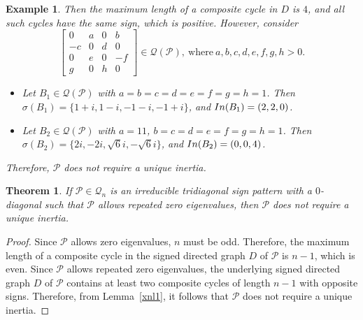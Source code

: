\documentclass[10pt,a4paper]{amsart}
\newtheorem{theorem}{Theorem}[section]
\newtheorem{eg}{Example}[section]
\numberwithin{equation}{section}
\def\In{{\rm In}}
\begin{document}
\begin{eg}
		Then the maximum length of a composite cycle in $D$ is $4$, and all such cycles have the same sign, which is positive. However, consider	$$\begin{bmatrix}
			0&a&0&b\\ -c&0&d&0\\ 0&e&0&-f\\ g&0&h&0
		\end{bmatrix}\in \mathcal{Q}(\mathcal{P}), ~\text{where}~ a,b,c,d,e,f,g,h>0.$$ \begin{itemize}
			\item[i.] Let $B_1 \in \mathcal{Q}(\mathcal{P})$ with $a = b = c = d = e = f = g = h = 1$. Then $\sigma(B_1) = \{1+i, 1-i,-1-i,-1+i\}$, and $\In(B_1) = (2, 2, 0)$.
			\item[ii.] Let $B_2 \in \mathcal{Q}(\mathcal{P})$ with $a = 11$, $ b = c = d = e = f = g = h = 1$. Then $\sigma(B_2) = \{2i,-2i,\sqrt{6}i,-\sqrt{6}i\}$, and $\In(B_2) = (0, 0, 4)$.
		\end{itemize}
		Therefore, $\mathcal{P}$ does not require a unique inertia.
	\end{eg}
	
	\begin{theorem} \label{l3.1n}
		If $\mathcal{P}\in \mathcal{Q}_n$ is an irreducible tridiagonal sign pattern with a $0$-diagonal such that $\mathcal{P}$ allows repeated zero eigenvalues, then $\mathcal{P}$ does not require a unique inertia.
	\end{theorem}
	\begin{proof} Since $\mathcal{P}$ allows zero eigenvalues, $n$ must be odd. Therefore, the maximum length of a composite cycle in the signed directed graph $D$ of $\mathcal{P}$ is $n-1$, which is even. Since $\mathcal{P}$ allows repeated zero eigenvalues, the underlying signed directed graph $D$ of $\mathcal{P}$ contains at least two composite cycles of length $n - 1$ with opposite signs.
		Therefore, from Lemma~\ref{xnl1}, it follows that $\mathcal{P}$ does not require a unique inertia.
	\end{proof}
	
\end{document}

